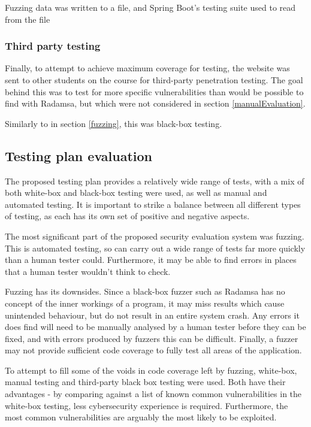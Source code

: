 Fuzzing data was written to a file, and Spring Boot's testing suite used to read from the file

\subsubsection{Third party testing}

Finally, to attempt to achieve maximum coverage for testing, the website was sent to other students on the course for third-party penetration testing. The goal behind this was to test for more specific vulnerabilities than would be possible to find with Radamsa, but which were not considered in section \ref{manualEvaluation}.

Similarly to in section \ref{fuzzing}, this was black-box testing. 

\subsection{Testing plan evaluation}

The proposed testing plan provides a relatively wide range of tests, with a mix of both white-box and  black-box testing were used, as well as manual and automated testing. It is important to strike a balance between all different types of testing, as each has its own set of positive and negative aspects. 

The most significant part of the proposed security evaluation system was fuzzing. This is automated testing, so can carry out a wide range of tests far more quickly than a human tester could. Furthermore, it may be able to find errors in places that a human tester wouldn't think to check. 

Fuzzing has its downsides. Since a black-box fuzzer such as Radamsa has no concept of the inner workings of a program, it may miss results which cause unintended behaviour, but do not result in an entire system crash. Any errors it does find will need to be manually analysed by a human tester before they can be fixed, and with errors produced by fuzzers this can be difficult. Finally, a fuzzer may not provide sufficient code coverage to fully test all areas of the application.  \cite{mwrFuzzing}

To attempt to fill some of the voids in code coverage left by fuzzing, white-box, manual testing and third-party black box testing were used. Both have their advantages - by comparing against a list of known common vulnerabilities in the white-box testing, less cybersecurity experience is required. Furthermore, the most common vulnerabilities are arguably the most likely to be exploited. 

